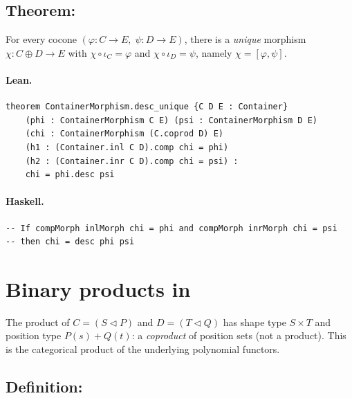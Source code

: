 \documentclass[11pt,a4paper]{article}
\begin{document}
\subsection{Theorem: }

\begin{thm}
For every cocone $(\varphi : C \to E,\; \psi : D \to E)$, there is a
\emph{unique} morphism $\chi : C \oplus D \to E$ with
$\chi \circ \iota_C = \varphi$ and $\chi \circ \iota_D = \psi$, namely
$\chi = [\varphi, \psi]$.
\end{thm}

\paragraph{Lean.}
\begin{lstlisting}[style=lean]
theorem ContainerMorphism.desc_unique {C D E : Container}
    (phi : ContainerMorphism C E) (psi : ContainerMorphism D E)
    (chi : ContainerMorphism (C.coprod D) E)
    (h1 : (Container.inl C D).comp chi = phi)
    (h2 : (Container.inr C D).comp chi = psi) :
    chi = phi.desc psi
\end{lstlisting}

\paragraph{Haskell.}
\begin{lstlisting}[style=haskell]
-- If compMorph inlMorph chi = phi and compMorph inrMorph chi = psi
-- then chi = desc phi psi
\end{lstlisting}


\section{Binary products in }

The product of $C = (S \triangleleft P)$ and $D = (T \triangleleft Q)$ has shape
type $S \times T$ and position type $P(s) + Q(t)$: a \emph{coproduct} of
position sets (not a product).  This is the categorical product of the
underlying polynomial functors.

\subsection{Definition: }
\end{document}
